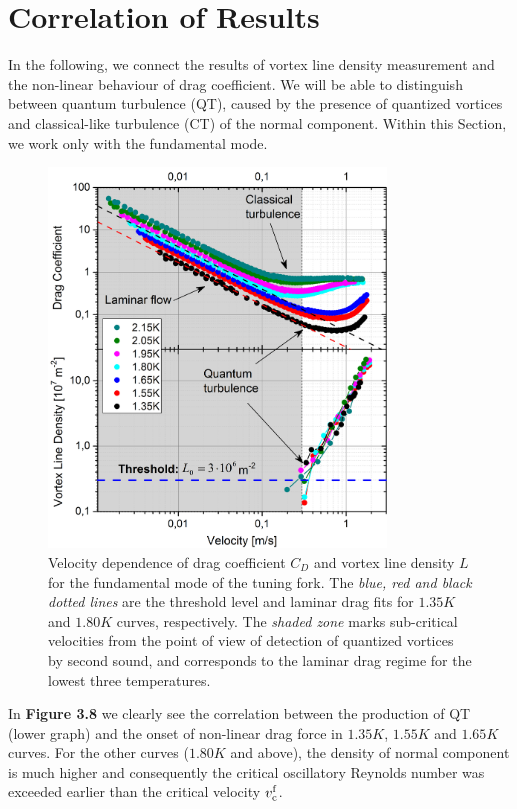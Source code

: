 \section{Correlation of Results}


In the following, we connect the results of vortex line density measurement and the non-linear behaviour of drag coefficient. We will be able to distinguish between quantum turbulence (QT), caused by the presence of quantized vortices and classical-like turbulence (CT) of the normal component. Within this Section, we work only with the fundamental mode.


\begin{figure}[h!]
	\centering
	\includegraphics[width=0.8\textwidth]{graphs/Merged_C+L_fund}
	\caption{Velocity dependence of drag coefficient $ C_D $ and vortex line density $ L $ for the fundamental mode of the tuning fork. The \textit{blue, red and black dotted lines} are the threshold level and laminar drag fits for $ 1.35\unit{K} $ and $ 1.80\unit{K} $ curves, respectively. The \textit{shaded zone} marks sub-critical velocities from the point of view of detection of quantized vortices by second sound, and corresponds to the laminar drag regime for the lowest three temperatures.}
\end{figure}


In {\sffamily\textbf{Figure 3.8}} we clearly see the correlation between the production of QT (lower graph) and the onset of non-linear drag force in $ 1.35\unit{K} $, $ 1.55\unit{K} $ and $ 1.65\unit{K} $ curves. For the other curves ($ 1.80 \unit{K} $ and above), the density of normal component is much higher and consequently the critical oscillatory Reynolds number was exceeded earlier than the critical velocity $v_{\mathrm{c}}^{\mathrm{f}}$.

